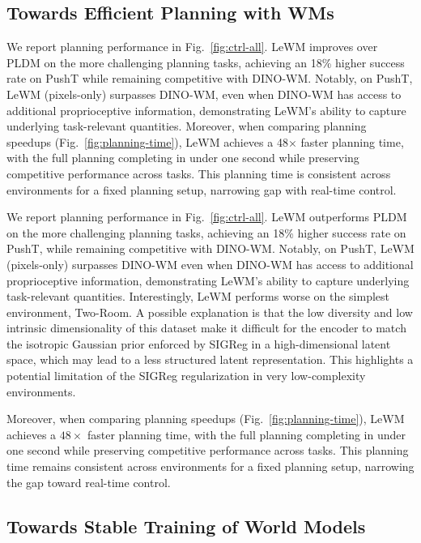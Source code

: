 \subsection{Towards Efficient Planning with WMs}


We report planning performance in Fig.~\ref{fig:ctrl-all}. LeWM improves over PLDM on the more challenging planning tasks, achieving an 18\% higher success rate on PushT while remaining competitive with DINO-WM. Notably, on PushT, LeWM (pixels-only) surpasses DINO-WM, even when DINO-WM has access to additional proprioceptive information, demonstrating LeWM’s ability to capture underlying task-relevant quantities. Moreover, when comparing planning speedups (Fig.~\ref{fig:planning-time}), LeWM achieves a 48× faster planning time, with the full planning completing in under one second while preserving competitive performance across tasks. This planning time is consistent across environments for a fixed planning setup, narrowing gap with real-time control.

We report planning performance in Fig.~\ref{fig:ctrl-all}. LeWM outperforms PLDM on the more challenging planning tasks, achieving an 18\% higher success rate on PushT, while remaining competitive with DINO-WM. Notably, on PushT, LeWM (pixels-only) surpasses DINO-WM even when DINO-WM has access to additional proprioceptive information, demonstrating LeWM’s ability to capture underlying task-relevant quantities. Interestingly, LeWM performs worse on the simplest environment, Two-Room. A possible explanation is that the low diversity and low intrinsic dimensionality of this dataset make it difficult for the encoder to match the isotropic Gaussian prior enforced by SIGReg in a high-dimensional latent space, which may lead to a less structured latent representation. This highlights a potential limitation of the SIGReg regularization in very low-complexity environments.

Moreover, when comparing planning speedups (Fig.~\ref{fig:planning-time}), LeWM achieves a $48\times$ faster planning time, with the full planning completing in under one second while preserving competitive performance across tasks. This planning time remains consistent across environments for a fixed planning setup, narrowing the gap toward real-time control.

\subsection{Towards Stable Training of World Models}

